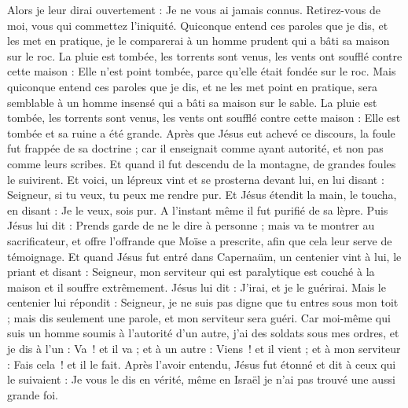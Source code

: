 \begin{multicols}{2}
Alors je leur dirai ouvertement : Je ne vous ai jamais connus. Retirez-vous de moi, vous qui commettez l'iniquité.
Quiconque entend ces paroles que je dis, et les met en pratique, je le comparerai à un homme prudent qui a bâti sa maison sur le roc.
La pluie est tombée, les torrents sont venus, les vents ont soufflé contre cette maison : Elle n'est point tombée, parce qu'elle était fondée sur le roc{}.
Mais quiconque entend ces paroles que je dis, et ne les met point en pratique, sera semblable à un homme insensé qui a bâti sa maison sur le sable.
La pluie est tombée, les torrents sont venus, les vents ont soufflé contre cette maison : Elle est tombée et sa ruine a été grande.
Après que Jésus eut achevé ce discours, la foule fut frappée de sa doctrine ;
car il enseignait comme ayant autorité, et non pas comme leurs scribes.
\VerseOne{}Et quand il fut descendu de la montagne, de grandes foules le suivirent.
Et voici, un lépreux vint et se prosterna devant lui, en lui disant : Seigneur{}, si tu veux, tu peux me rendre pur.
Et Jésus étendit la main, le toucha, en disant : Je le veux, sois pur. A l’instant même il fut purifié de sa lèpre.
Puis Jésus lui dit : Prends garde de ne le dire à personne ; mais va te montrer au sacrificateur, et offre l’offrande que Moïse a prescrite, afin que cela leur serve de témoignage.
Et quand Jésus fut entré dans Capernaüm, un centenier vint à lui, le priant
et disant : Seigneur, mon serviteur qui est paralytique est couché à la maison et il souffre extrêmement.
Jésus lui dit : J'irai, et je le guérirai.
Mais le centenier lui répondit : Seigneur, je ne suis pas digne que tu entres sous mon toit ; mais dis seulement une parole, et mon serviteur sera guéri.
Car moi-même qui suis un homme soumis à l’autorité d’un autre, j'ai des soldats sous mes ordres, et je dis à l'un : Va ! et il va ; et à un autre : Viens ! et il vient ; et à mon serviteur : Fais cela ! et il le fait.
Après l’avoir entendu, Jésus fut étonné et dit à ceux qui le suivaient : Je vous le dis en vérité, même en Israël je n'ai pas trouvé une aussi grande foi.

\end{multicols}
